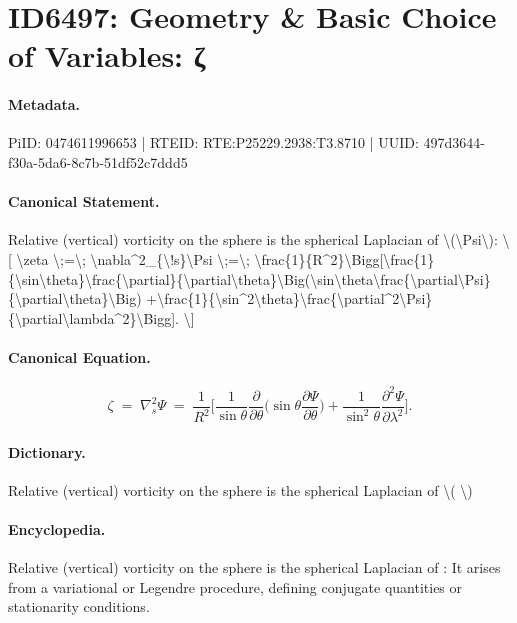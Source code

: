\section*{ID6497: Geometry \& Basic Choice of Variables: ζ}
\paragraph{Metadata.}
PiID: 0474611996653 | RTEID: RTE:P25229.2938:T3.8710 | UUID: 497d3644-f30a-5da6-8c7b-51df52c7ddd5

\paragraph{Canonical Statement.}
Relative (vertical) vorticity on the sphere is the spherical Laplacian of \textbackslash{}(\textbackslash{}Psi\textbackslash{}): \textbackslash{}[ \textbackslash{}zeta \textbackslash{};=\textbackslash{}; \textbackslash{}nabla\textasciicircum{}2\_\{\textbackslash{}!s\}\textbackslash{}Psi \textbackslash{};=\textbackslash{}; \textbackslash{}frac\{1\}\{R\textasciicircum{}2\}\textbackslash{}Bigg[\textbackslash{}frac\{1\}\{\textbackslash{}sin\textbackslash{}theta\}\textbackslash{}frac\{\textbackslash{}partial\}\{\textbackslash{}partial\textbackslash{}theta\}\textbackslash{}Big(\textbackslash{}sin\textbackslash{}theta\textbackslash{}frac\{\textbackslash{}partial\textbackslash{}Psi\}\{\textbackslash{}partial\textbackslash{}theta\}\textbackslash{}Big) +\textbackslash{}frac\{1\}\{\textbackslash{}sin\textasciicircum{}2\textbackslash{}theta\}\textbackslash{}frac\{\textbackslash{}partial\textasciicircum{}2\textbackslash{}Psi\}\{\textbackslash{}partial\textbackslash{}lambda\textasciicircum{}2\}\textbackslash{}Bigg]. \textbackslash{}]

\paragraph{Canonical Equation.}
\[
\zeta \;=\; \nabla^2_{\!s}\Psi \;=\; \frac{1}{R^2}\Bigg[\frac{1}{\sin\theta}\frac{\partial}{\partial\theta}\Big(\sin\theta\frac{\partial\Psi}{\partial\theta}\Big) +\frac{1}{\sin^2\theta}\frac{\partial^2\Psi}{\partial\lambda^2}\Bigg].
\]

\paragraph{Dictionary.}
Relative (vertical) vorticity on the sphere is the spherical Laplacian of \textbackslash{}( \textbackslash{})

\paragraph{Encyclopedia.}
Relative (vertical) vorticity on the sphere is the spherical Laplacian of : It arises from a variational or Legendre procedure, defining conjugate quantities or stationarity conditions.
